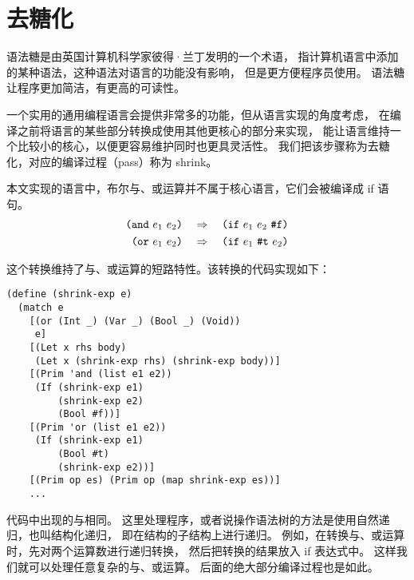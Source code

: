 
\section{去糖化}

语法糖是由英国计算机科学家彼得·兰丁发明的一个术语，
指计算机语言中添加的某种语法，这种语法对语言的功能没有影响，
但是更方便程序员使用。
语法糖让程序更加简洁，有更高的可读性。

一个实用的通用编程语言会提供非常多的功能，但从语言实现的角度考虑，
在编译之前将语言的某些部分转换成使用其他更核心的部分来实现，
能让语言维持一个比较小的核心，以便更容易维护同时也更具灵活性。
我们把该步骤称为去糖化，对应的编译过程（pass）称为 shrink。

本文实现的语言中，布尔与、或运算并不属于核心语言，它们会被编译成 if 语句。
\begin{align*}
  \texttt{(} \texttt{and}~e_1~e_2\texttt{)} & \quad \Rightarrow \quad \texttt{(}\texttt{if}~e_1~e_2~\texttt{\#f}{}\texttt{)}\\
  \texttt{(} \texttt{or}~e_1~e_2\texttt{)} & \quad \Rightarrow \quad \texttt{(}\texttt{if}~e_1~\texttt{\#t}{}~e_2\texttt{)}
\end{align*}
\begin{comment}
\begin{transformation}
\CAND{e_1}{e_2}
\compilesto
\begin{lstlisting}
\CIF{e_1}{e_2}{\FALSE{}}
\end{lstlisting}
\end{transformation}
\end{comment}


这个转换维持了与、或运算的短路特性。该转换的代码实现如下：

\begin{lstlisting}
(define (shrink-exp e)
  (match e
    [(or (Int _) (Var _) (Bool _) (Void))
     e]
    [(Let x rhs body)
     (Let x (shrink-exp rhs) (shrink-exp body))]
    [(Prim 'and (list e1 e2))
     (If (shrink-exp e1)
         (shrink-exp e2)
         (Bool #f))]
    [(Prim 'or (list e1 e2))
     (If (shrink-exp e1)
         (Bool #t)
         (shrink-exp e2))]
    [(Prim op es) (Prim op (map shrink-exp es))]
    ...
\end{lstlisting}

代码中出现的与相同。
这里处理程序，或者说操作语法树的方法是使用自然递归，也叫结构化递归，
即在结构的子结构上进行递归。
例如，在转换与、或运算时，先对两个运算数进行递归转换，
然后把转换的结果放入 if 表达式中。
这样我们就可以处理任意复杂的与、或运算。
后面的绝大部分编译过程也是如此。
